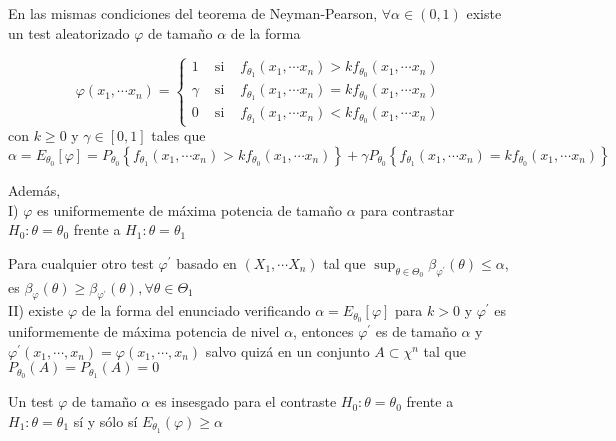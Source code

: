 \begin{teorema}
En las mismas condiciones del teorema de Neyman-Pearson, $\forall \alpha \in(0,1)$ existe un test aleatorizado $\varphi$ de tamaño $\alpha$ de la forma

$$
\varphi\left(x_{1}, \cdots x_{n}\right)=\left\{\begin{array}{ccc}
1 & \text { si } & f_{\theta_{1}}\left(x_{1}, \cdots x_{n}\right)>k f_{\theta_{0}}\left(x_{1}, \cdots x_{n}\right) \\
\gamma & \text { si } & f_{\theta_{1}}\left(x_{1}, \cdots x_{n}\right)=k f_{\theta_{0}}\left(x_{1}, \cdots x_{n}\right) \\
0 & \text { si } & f_{\theta_{1}}\left(x_{1}, \cdots x_{n}\right)<k f_{\theta_{0}}\left(x_{1}, \cdots x_{n}\right)
\end{array}\right.
$$
con $k \geq 0$ y $\gamma \in[0,1]$ tales que
$$
\alpha=E_{\theta_{0}}[\varphi]=P_{\theta_{0}}\left\{f_{\theta_{1}}\left(x_{1}, \cdots x_{n}\right)>k f_{\theta_{0}}\left(x_{1}, \cdots x_{n}\right)\right\}+\gamma P_{\theta_{0}}\left\{f_{\theta_{1}}\left(x_{1}, \cdots x_{n}\right)=k f_{\theta_{0}}\left(x_{1}, \cdots x_{n}\right)\right\}
$$

Además,\\
I) $\varphi$ es uniformemente de máxima potencia de tamaño $\alpha$ para contrastar $H_{0}: \theta=\theta_{0}$ frente a $H_{1}: \theta=\theta_{1}$

Para cualquier otro test $\varphi^{\prime}$ basado en $\left(X_{1}, \cdots X_{n}\right)$ tal que $\sup _{\theta \in \Theta_{0}} \beta_{\varphi^{\prime}}(\theta) \leq \alpha$, es $\beta_{\varphi}(\theta) \geq \beta_{\varphi^{\prime}}(\theta), \forall \theta \in \Theta_{1}$\\
II) existe $\varphi$ de la forma del enunciado verificando $\alpha=E_{\theta_{0}}[\varphi]$ para $k>0$ y $\varphi^{\prime}$ es uniformemente de máxima potencia de nivel $\alpha$, entonces $\varphi^{\prime}$ es de tamaño $\alpha$ y $\varphi^{\prime}\left(x_{1}, \cdots, x_{n}\right)=\varphi\left(x_{1}, \cdots, x_{n}\right)$ salvo quizá en un conjunto $A \subset \chi^{n}$ tal que $P_{\theta_{0}}(A)=P_{\theta_{1}}(A)=0$    
\end{teorema}


\begin{definición} 
Un test $\varphi$ de tamaño $\alpha$ es insesgado para el contraste $H_{0}: \theta=\theta_{0}$ frente a $H_{1}: \theta=\theta_{1}$ sí y sólo sí $E_{\theta_{1}}(\varphi) \geq \alpha$
\end{definición}


